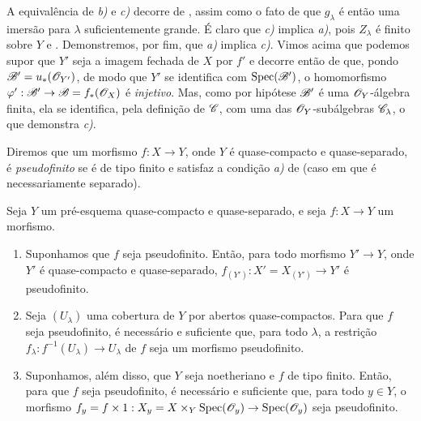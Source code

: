 A equivalência de \emph{b)} e \emph{c)} decorre de , assim como o fato de que $g_\lambda$ é então uma imersão para $\lambda$ suficientemente grande.
É claro que \emph{c)} implica \emph{a)}, pois $Z_\lambda$ é finito sobre $Y$  e .
Demonstremos, por fim, que \emph{a)} implica \emph{c)}.
Vimos acima que podemos supor que $Y'$ seja a imagem fechada de $X$ por $f'$ e decorre então de  que, pondo $\mathscr{B}'=u_*(\mathscr{O}_{Y'})$, de modo que $Y'$ se identifica com $\operatorname{Spec}(\mathscr{B}')$, o homomorfismo $\varphi':\sh{B}'\to\sh{B}=f_*(\sh{O}_X)$ é \emph{injetivo}.
Mas, como por hipótese $\mathscr{B}'$ é uma $\mathscr{O}_Y$-álgebra finita, ela se identifica, pela definição de $\mathscr{C}$, com uma das $\mathscr{O}_Y$-subálgebras $\mathscr{C}_\lambda$, o que demonstra \emph{c)}.

Diremos que um morfismo $f:X\to Y$, onde $Y$ é quase-compacto e quase-separado, é \emph{pseudofinito} se é de tipo finito e satisfaz a condição \emph{a)} de  (caso em que é necessariamente separado).

\begin{corollary}[8.12.4]
\label{IV.8.12.4}
Seja $Y$ um pré-esquema quase-compacto e quase-separado, e seja $f:X\to Y$ um morfismo.
\begin{enumerate}[label=(\roman*)]
  \item Suponhamos que $f$ seja pseudofinito.
Então, para todo morfismo $Y'\to Y$, onde $Y'$ é quase-compacto e quase-separado, $f_{(Y')}:X'=X_{(Y')}\to Y'$ é pseudofinito.
  \item Seja $(U_\lambda)$ uma cobertura de $Y$ por abertos quase-compactos.
Para que $f$ seja pseudofinito, é necessário e suficiente que, para todo $\lambda$, a restrição $f_\lambda:f^{-1}(U_\lambda)\to U_\lambda$ de $f$ seja um morfismo pseudofinito.
  \item Suponhamos, além disso, que $Y$ seja noetheriano e $f$ de tipo finito.
Então, para que $f$ seja pseudofinito, é necessário e suficiente que, para todo $y\in Y$, o morfismo $f_y=f\times 1:X_y=X\times_Y\operatorname{Spec}(\sh{O}_y)\to\operatorname{Spec}(\sh{O}_y)$ seja pseudofinito.
\end{enumerate}
\end{corollary}

